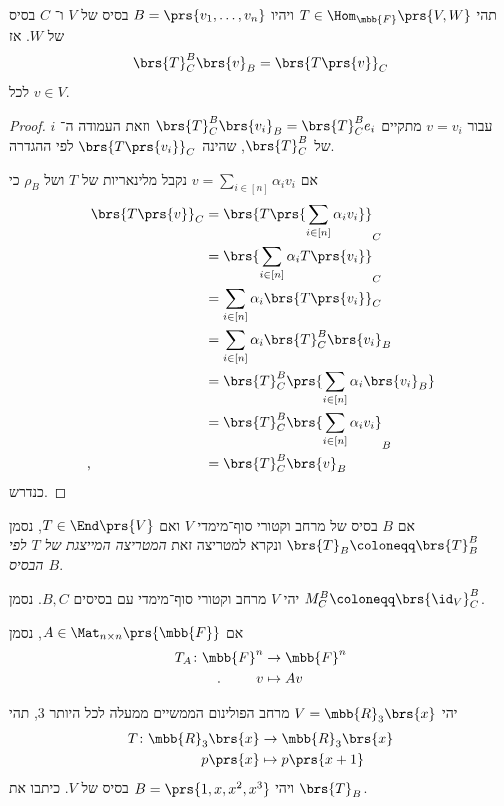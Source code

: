 \documentclass[a4paper,10pt,twoside,openany]{book}
\begin{document}
\begin{proposition}
תהי
$T \in \Hom_{\mbb{F}}\prs{V,W}$
ויהיו
$B = \prs{v_1, \ldots, v_n}$
בסיס של
$V$
ו־%
$C$
בסיס של
$W$.
אז
\[\brs{T}^B_C \brs{v}_B = \brs{T\prs{v}}_C\]
לכל
$v \in V$.
\end{proposition}

\pagebreak
\begin{proof}
עבור
$v = v_i$
מתקיים
$\brs{T}^B_C \brs{v_i}_B = \brs{T}^B_C e_i$
וזאת העמודה ה־%
$i$
של
$\brs{T}^B_C$,
שהינה
$\brs{T\prs{v_i}}_C$
לפי ההגדרה.

אם
$v = \sum_{i \in [n]} \alpha_i v_i$
נקבל מלינאריות של
$T$
ושל
$\rho_B$
כי
\begin{align*}
\brs{T\prs{v}}_C &= \brs{T\prs{\sum_{i \in [n]} \alpha_i v_i}}_C
\\&= \brs{\sum_{i \in [n]} \alpha_i T\prs{v_i}}_C
\\&= \sum_{i \in [n]} \alpha_i \brs{T\prs{v_i}}_C
\\&= \sum_{i \in [n]} \alpha_i \brs{T}^B_C \brs{v_i}_B
\\&= \brs{T}^B_C \prs{\sum_{i \in [n]} \alpha_i \brs{v_i}_B}
\\&= \brs{T}^B_C \brs{\sum_{i \in [n]} \alpha_i v_i}_B
\\\text{,} \hphantom{\brs{T\prs{v}}_C} &= \brs{T}^B_C \brs{v}_B
\end{align*}
כנדרש.
\end{proof}

\begin{notation}
אם
$B$
בסיס של מרחב וקטורי סוף־מימדי
$V$
ואם
$T \in \End\prs{V}$,
נסמן
$\brs{T}_B \coloneqq \brs{T}^B_B$
ונקרא למטריצה זאת
\emph{המטריצה המייצגת של
$T$
לפי הבסיס
$B$}.
\end{notation}

\begin{notation}
יהי
$V$
מרחב וקטורי סוף־מימדי עם בסיסים
$B,C$.
נסמן
$M^B_C \coloneqq \brs{\id_V}^B_C$.
\end{notation}

\begin{notation}
אם
$A \in \Mat_{n\times n}\prs{\mbb{F}}$,
נסמן
\begin{align*}
T_A \colon \mbb{F}^n &\to \mbb{F}^n \\
\text{.} \hphantom{lalala} v &\mapsto Av
\end{align*}
\end{notation}

\begin{exercisechap}\label{ex:p(x+1)}
יהי
$V = \mbb{R}_3\brs{x}$
מרחב הפולינום הממשיים ממעלה לכל היותר
$3$,
תהי
\begin{align*}
T \colon \mbb{R}_3\brs{x} &\to \mbb{R}_3\brs{x} \\
p\prs{x} &\mapsto p\prs{x+1}
\end{align*}
ויהי
$B = \prs{1,x,x^2,x^3}$
בסיס של
$V$.
כיתבו את
$\brs{T}_B$.
\end{exercisechap}
\end{document}
